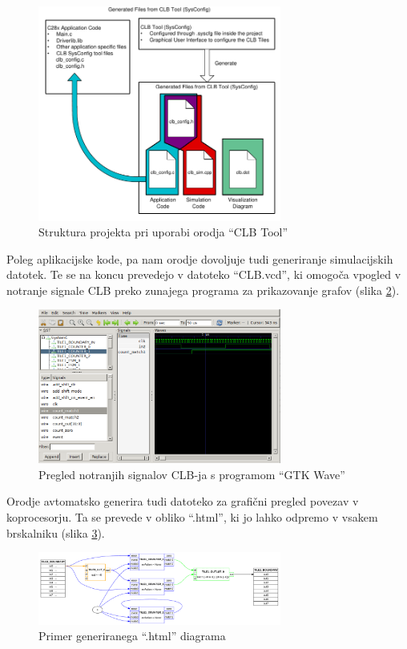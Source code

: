 \documentclass[a4paper]{article}
\begin{document}
\begin{sloppypar}
\begin{figure}[htb]
    \centerline{\includegraphics[width=8cm]{clbtool_struktura}}
    \caption{Struktura projekta pri uporabi orodja ``CLB Tool''
             \cite[Pogl.~1]{clb-user-guide}}
    \label{fig:clbtool_struktura} 
\end{figure} 

Poleg aplikacijske kode, pa nam orodje dovoljuje tudi generiranje simulacijskih
datotek. Te se na koncu prevedejo v datoteko ``CLB.vcd'', ki omogoča vpogled v
notranje signale CLB preko zunajega programa za prikazovanje grafov (slika
\ref{fig:clbtool_simulacija}).

\begin{figure}[htb]
    \centerline{\includegraphics[width=8cm]{gtkwave}}
    \caption{Pregled notranjih signalov CLB-ja s programom ``GTK Wave''}
    \label{fig:clbtool_simulacija} 
\end{figure} 

Orodje avtomatsko generira tudi datoteko za grafični pregled povezav v
koprocesorju. Ta se prevede v obliko ``.html'', ki jo lahko odpremo v vsakem
brskalniku (slika \ref{fig:clbtool_diagram})\cite[Pogl.~1]{clb-user-guide}.

\begin{figure}[htb]
    \centerline{\includegraphics[width=8cm]{html_diagram}}
    \caption{Primer generiranega ``.html'' diagrama}
    \label{fig:clbtool_diagram} 
\end{figure} 


\end{sloppypar}
\end{document}
